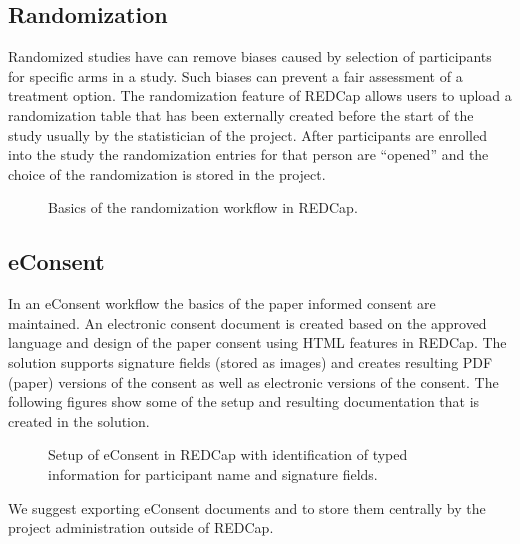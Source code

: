 \documentclass[letterpaper,10pt,english]{sphinxmanual}
\begin{document}
\subsection{Randomization}
\label{\detokenize{EndUser/index:randomization}}
\sphinxAtStartPar
Randomized studies have can remove biases caused by selection of participants for specific arms in a study. Such biases can prevent a fair assessment of a treatment option. The randomization feature of REDCap allows users to upload a randomization table that has been externally created before the start of the study \textendash{} usually by the statistician of the project. After participants are enrolled into the study the randomization entries for that person are “opened” and the choice of the randomization is stored in the project.

\begin{figure}[htbp]
\centering
\capstart

\noindent{}
\caption{Basics of the randomization workflow in REDCap.}\label{\detokenize{EndUser/index:id4}}\end{figure}


\subsection{e\sphinxhyphen{}Consent}
\label{\detokenize{EndUser/index:e-consent}}
\sphinxAtStartPar
In an e\sphinxhyphen{}Consent workflow the basics of the paper informed consent are maintained. An electronic consent document is created based on the approved language and design of the paper consent using HTML features in REDCap. The solution supports signature fields (stored as images) and creates resulting PDF (paper) versions of the consent as well as electronic versions of the consent. The following figures show some of the setup and resulting documentation that is created in the solution.

\begin{figure}[htbp]
\centering
\capstart

\noindent{}
\caption{Setup of e\sphinxhyphen{}Consent in REDCap with identification of typed information for participant name and signature fields.}\label{\detokenize{EndUser/index:id5}}\end{figure}

\sphinxAtStartPar
We suggest exporting e\sphinxhyphen{}Consent documents and to store them centrally by the project administration outside of REDCap.
\end{document}
